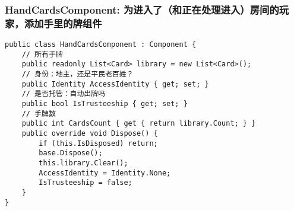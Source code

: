 \documentclass[9pt, b5paper]{article}
\begin{document}
\subsubsection{HandCardsComponent: 为进入了（和正在处理进入）房间的玩家，添加手里的牌组件}
\label{sec-1-6-4}
\begin{verbatim}
public class HandCardsComponent : Component {
    // 所有手牌
    public readonly List<Card> library = new List<Card>();
    // 身份：地主，还是平民老百姓？
    public Identity AccessIdentity { get; set; }
    // 是否托管：自动出牌吗
    public bool IsTrusteeship { get; set; }
    // 手牌数
    public int CardsCount { get { return library.Count; } }
    public override void Dispose() {
        if (this.IsDisposed) return;
        base.Dispose();
        this.library.Clear();
        AccessIdentity = Identity.None;
        IsTrusteeship = false;
    }
}
\end{verbatim}
\end{document}

